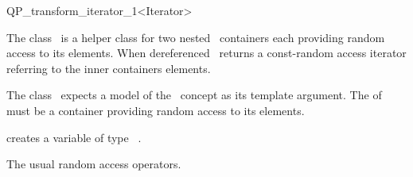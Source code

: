 
\begin{ccRefClass}{QP_transform_iterator_1<Iterator>}

\ccDefinition
The class \ccRefName\ is a helper class for two nested \stl\ containers each
providing random access to its elements. When dereferenced \ccRefName\
returns a const-random access iterator referring to the inner containers
elements. 



\ccRequirements
\ccIndexRequirements
The class \ccRefName\ expects a model of the \stl \ concept
 as its template argument. The  of
\ccc{Iterator} must be a container providing random access to its elements.

\ccTypes \ccIndexClassTypes



\ccCreation
\ccIndexClassCreation
{}

{creates a variable of type \ccRefName\  .}

\ccUnchecked

\ccAccessFunctions
\begin{ccIndexMemberFunctions}
The usual random access operators.






\ccModifiers
{}




\end{ccIndexMemberFunctions}
\end{ccRefClass}
